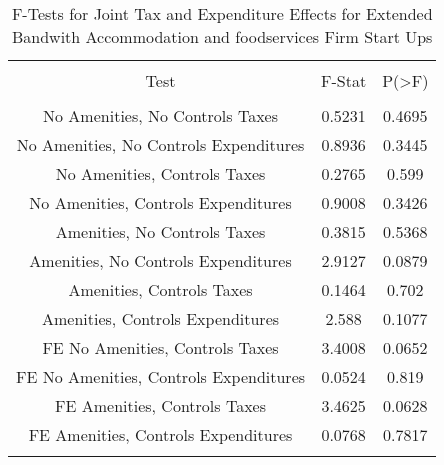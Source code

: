 
\begin{table}[!htbp] \centering 
  \caption{F-Tests for Joint Tax and Expenditure Effects for Extended Bandwith Accommodation and foodservices Firm Start Ups} 
  \label{72Ftests} 
\begin{tabular}{@{\extracolsep{5pt}} ccc} 
\\[-1.8ex]\hline 
\hline \\[-1.8ex] 
Test & F-Stat & P(\textgreater F) \\ 
\hline \\[-1.8ex] 
No Amenities, No Controls Taxes & 0.5231 & 0.4695 \\ 
No Amenities, No Controls Expenditures & 0.8936 & 0.3445 \\ 
No Amenities, Controls Taxes & 0.2765 & 0.599 \\ 
No Amenities, Controls Expenditures & 0.9008 & 0.3426 \\ 
Amenities, No Controls Taxes & 0.3815 & 0.5368 \\ 
Amenities, No Controls Expenditures & 2.9127 & 0.0879 \\ 
Amenities, Controls Taxes & 0.1464 & 0.702 \\ 
Amenities, Controls Expenditures & 2.588 & 0.1077 \\ 
FE No Amenities, Controls Taxes & 3.4008 & 0.0652 \\ 
FE No Amenities, Controls Expenditures & 0.0524 & 0.819 \\ 
FE Amenities, Controls Taxes & 3.4625 & 0.0628 \\ 
FE Amenities, Controls Expenditures & 0.0768 & 0.7817 \\ 
\hline \\[-1.8ex] 
\end{tabular} 
\end{table} 
